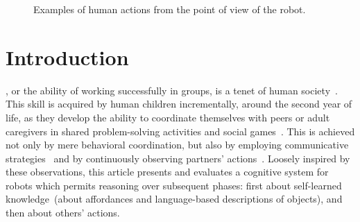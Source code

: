 
\begin{figure*}
  \centering


  \caption{Examples of human actions from the point of view of the robot.}
  \label{fig:action_examples}
\end{figure*}

\section{Introduction}
\label{sec:intro}

, or the ability of working successfully in groups, is a tenet of human society~\cite{turner:1975}.
This skill is acquired by human children incrementally, around the second year of life, as they develop the ability to coordinate themselves with peers or adult caregivers in shared problem-solving activities and social games~\cite{brownell:2006:childdev}.
This is achieved not only by mere behavioral coordination, but also by employing communicative strategies~\cite{melis:2010:rstb} and by continuously observing partners' actions~\cite{ramnani:2004:natureneuro}.
Loosely inspired by these observations, this article presents and evaluates a cognitive system for robots which permits reasoning over subsequent phases:
first about self-learned knowledge~(about affordances and language-based descriptions of objects),
and then about others' actions.

